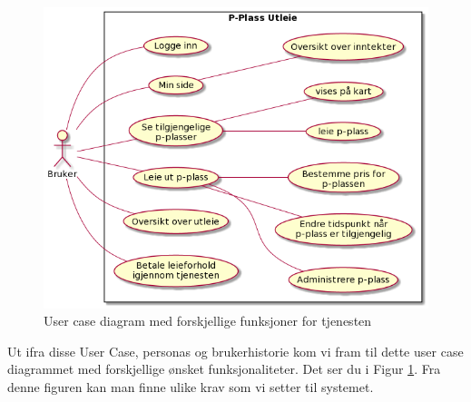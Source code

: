 \begin{figure}[H]
    \centering
    \includegraphics[width=\textwidth]{bilder/uml/usercase_diagram.png}
    \caption{User case diagram med forskjellige funksjoner for tjenesten}
    \label{fig:user_case}
\end{figure}
Ut ifra disse User Case, personas og brukerhistorie kom vi fram til dette user case diagrammet med forskjellige ønsket funksjonaliteter. 
Det ser du i Figur \ref{fig:user_case}.
Fra denne figuren kan man finne ulike krav som vi setter til systemet.
